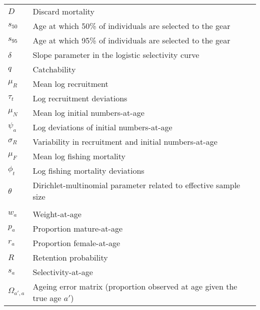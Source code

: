 \documentclass[]{article}
\begin{document}
\begin{table}
\begin{tabular}[t]{ll}
\hspace{1em}$D$ & Discard mortality\\
\hspace{1em}$s_{50}$ & Age at which 50\% of individuals are selected to the gear\\
\hspace{1em}$s_{95}$ & Age at which 95\% of individuals are selected to the gear\\
\hspace{1em}$\delta$ & Slope parameter in the logistic selectivity curve\\
\hspace{1em}$q$ & Catchability\\
\hspace{1em}$\mu_R$ & Mean log recruitment\\
\hspace{1em}$\tau_t$ & Log recruitment deviations\\
\hspace{1em}$\mu_N$ & Mean log initial numbers-at-age\\
\hspace{1em}$\psi_a$ & Log deviations of initial numbers-at-age\\
\hspace{1em}$\sigma_R$ & Variability in recruitment and initial numbers-at-age\\
\hspace{1em}$\mu_F$ & Mean log fishing mortality\\
\hspace{1em}$\phi_t$ & Log fishing mortality deviations\\
\hspace{1em}$\theta$ & Dirichlet-multinomial parameter related to effective sample size\\
\addlinespace[0.3em]
\multicolumn{2}{l}{\textbf{$\textit{Data and predicted variables}$}}\\
\hspace{1em}$w_a$ & Weight-at-age\\
\hspace{1em}$p_a$ & Proportion mature-at-age\\
\hspace{1em}$r_a$ & Proportion female-at-age\\
\hspace{1em}$R$ & Retention probability\\
\hspace{1em}$s_a$ & Selectivity-at-age\\
\hspace{1em}$\Omega_{a',a}$ & Ageing error matrix (proportion observed at age given the true age $a'$)\\

\end{tabular}
\end{table}
\end{document}
